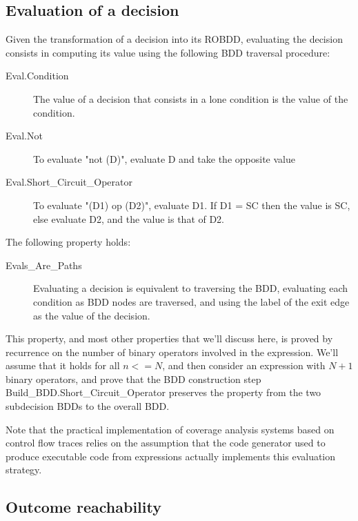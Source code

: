 \documentclass[a4paper,12pt,twoside]{article}
\begin{document}
\subsection{Evaluation of a decision}

Given the transformation of a decision into its ROBDD, evaluating the
decision consists in computing its value using the following BDD traversal
procedure:

\begin{description}
\item[Eval.Condition]
  The value of a decision that consists in a lone condition is the
  value of the condition.

\item[Eval.Not]
  To evaluate "not (D)", evaluate D and take the opposite value

\item[Eval.Short\_Circuit\_Operator]
  To evaluate "(D1) op (D2)", evaluate D1. If D1 = SC then the
  value is SC, else evaluate D2, and the value is that of D2.
\end{description}

The following property holds:

\begin{description}
\item[Evals\_Are\_Paths]
  Evaluating a decision is equivalent to traversing the BDD, evaluating
  each condition as BDD nodes are traversed, and using the label of the
  exit edge as the value of the decision.
\end{description}

This property, and most other properties that we'll discuss here,
is proved by recurrence on the number of binary operators involved in
the expression. We'll assume that it holds for all $n <= N$, and then
consider an expression with $N+1$ binary operators, and prove that
the BDD construction step Build\_BDD.Short\_Circuit\_Operator preserves
the property from the two subdecision BDDs to the overall BDD.

Note that the practical implementation of coverage analysis systems based
on control flow traces relies on the assumption that the code generator
used to produce executable code from expressions actually implements this
evaluation strategy.

\subsection{Outcome reachability}
\end{document}
